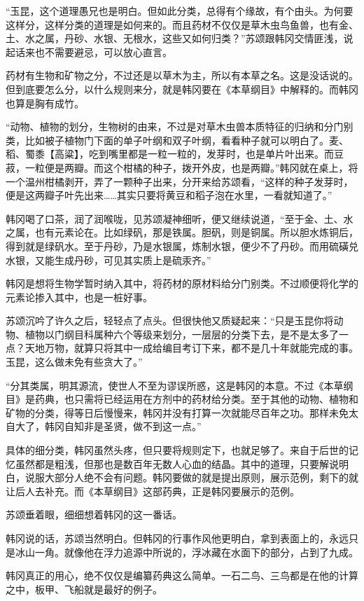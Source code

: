 “玉昆，这个道理愚兄也是明白。但如此分类，总得有个缘故，有个由头。为何要这样分，这样分类的道理是如何来的。而且药材不仅仅是草木虫鸟鱼兽，也有金、土、水之属，丹砂、水银、无根水，这些又如何归类？”苏颂跟韩冈交情匪浅，说起话来也不需要避忌，可以放心直言。 

药材有生物和矿物之分，不过还是以草木为主，所以有本草之名。这是没话说的。但到底要怎么分，以什么规则来分，就是韩冈要在《本草纲目》中解释的。而韩冈也算是胸有成竹。 

“动物、植物的划分，生物树的由来，不过是对草木虫兽本质特征的归纳和分门别类，比如被子植物门下面的单子叶纲和双子叶纲，看看种子就可以明白了。麦、稻、蜀黍【高粱】，吃到嘴里都是一粒一粒的，发芽时，也是单片叶出来。而豆菽，一粒便是两瓣。而这个柑橘的种子，拨开外皮，也是两瓣。”韩冈就在桌上，将一个温州柑橘剥开，弄了一颗种子出来，分开来给苏颂看，“这样的种子发芽时，便是这两瓣子叶先出来……其实只要将黄豆和稻子泡在水里，一看就知道了。” 

韩冈喝了口茶，润了润喉咙，见苏颂凝神细听，便又继续说道，“至于金、土、水之属，也有元素论在。比如绿矾，那是铁属。胆矾，则是铜属。所以胆水炼铜后，得到就是绿矾水。至于丹砂，乃是水银属，炼制水银，便少不了丹砂。而用硫磺兑水银，又能生成丹砂，可见其实质上是硫汞齐。” 

韩冈是想将生物学暂时纳入其中，将药材的原材料给分门别类。不过顺便将化学的元素论掺入其中，也是一桩好事。 

苏颂沉吟了许久之后，轻轻点了点头。但很快他又质疑起来：“只是玉昆你将动物、植物以门纲目科属种六个等级来划分，一层层的分类下去，是不是太多了一点？天地万物，就算只将其中一成给编目考订下来，都不是几十年就能完成的事。玉昆，这么做未免有些贪大了。” 

“分其类属，明其源流，使世人不至为谬误所惑，这是韩冈的本意。不过《本草纲目》是药典，也只需将已经运用在方剂中的药材给分类。至于其他的动物、植物和矿物的分类，得等日后慢慢来，韩冈并没有打算一次就能尽百年之功。那样未免太自大了，韩冈自知非是圣贤，做不到这一点。” 

具体的细分类，韩冈虽然头疼，但只要将规则定下，也就足够了。来自于后世的记忆虽然都是粗浅，但那也是数百年无数人心血的结晶。其中的道理，只要解说明白，说服大部分人绝不会有问题。韩冈要做的就是提出原则，展示范例，剩下的就让后人去补充。而《本草纲目》这部药典，正是韩冈要展示的范例。 

苏颂垂着眼，细细想着韩冈的这一番话。 

韩冈说的话，苏颂当然明白。但韩冈的行事作风他更明白，拿到表面上的，永远只是冰山一角。就像他在浮力追源中所说的，浮冰藏在水面下的部分，占到了九成。 

韩冈真正的用心，绝不仅仅是编纂药典这么简单。一石二鸟、三鸟都是在他的计算之中，板甲、飞船就是最好的例子。 

